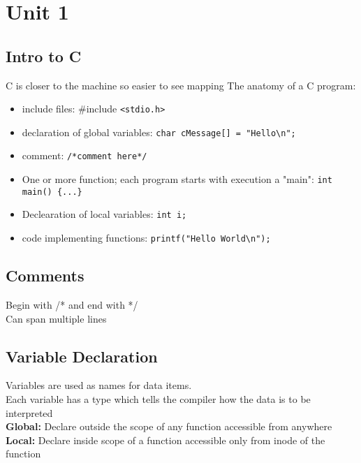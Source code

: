 \documentclass[answers,12pt,addpoints]{exam}
\begin{document}
\section{Unit 1}
\subsection{Intro to C}
C is closer to the machine so easier to see mapping
The anatomy of a C program:
\begin{itemize}
    \item include files: \#include \texttt{<stdio.h>}
    \item declaration of global variables: \texttt{char cMessage[] = "Hello\textbackslash n";}
    \item comment: \texttt{/*comment here*/}
    \item One or more function; each program starts with execution a "main": \texttt{int main() \{...\}}
    \item Declearation of local variables: \texttt{int i;}
    \item code implementing functions: \texttt{printf("Hello World\textbackslash n");}
\end{itemize}

\subsection{Comments}
Begin with /* and end with */ \\
Can span multiple lines \\

\subsection{Variable Declaration}
Variables are used as names for data items. \\
Each variable has a type which tells the compiler how the data is to be interpreted \\
\textbf{Global:}
Declare outside the scope of any function accessible from anywhere\\
\textbf{Local:}
Declare inside scope of a function accessible only from inode of the function\\
\end{document}
